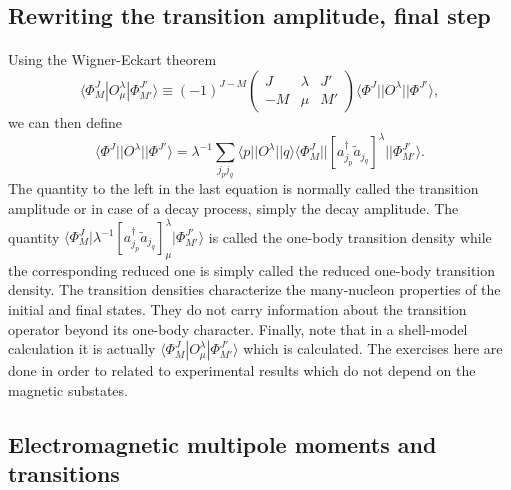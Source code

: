 \documentclass[%
oneside,                 %
final,                   %
10pt]{article}
\begin{document}
\subsection{Rewriting the transition amplitude, final step}

\paragraph{}
Using the Wigner-Eckart theorem
\[
\langle \Phi^J_M|O^{\lambda}_{\mu}|\Phi^{J'}_{M'}\rangle\equiv(-1)^{J-M}\left(\begin{array}{ccc}  J & \lambda & J' \\ -M & \mu & M'\end{array}\right)\langle \Phi^J||O^{\lambda}||\Phi^{J'}\rangle,
\]
we can then define 
\[
\langle \Phi^J||O^{\lambda}||\Phi^{J'}\rangle = \lambda^{-1}\sum_{j_pj_q} \langle p \vert \vert O^{\lambda} \vert\vert q \rangle \langle \Phi_{M}^{J}\vert\vert \left[ a_{j_p}^{\dagger}\tilde{a}_{j_q}\right]^{\lambda}\vert  \vert \Phi_{M'}^{J'}\rangle.
\]
The quantity to the left in the last equation is normally called the transition amplitude or in case of a decay process, simply the decay amplitude.  The quantity 
$\langle \Phi_{M}^{J}\vert \lambda^{-1}\left[ a_{j_p}^{\dagger}\tilde{a}_{j_q}\right]^{\lambda}_{\mu}  \vert \Phi_{M'}^{J'}\rangle$ is called the one-body transition density while the corresponding reduced one is simply called the reduced one-body transition density. 
The transition densities characterize the many-nucleon
properties of the initial  and final states. They do not
carry information about the transition operator beyond its one-body character. 
Finally, note that in a shell-model calculation it is actually $\langle \Phi^J_M|O^{\lambda}_{\mu}|\Phi^{J'}_{M'}\rangle$ which is calculated. The exercises here are done in order to related to experimental results which do not depend on the magnetic substates.







\subsection{Electromagnetic multipole moments and transitions}

\end{document}
